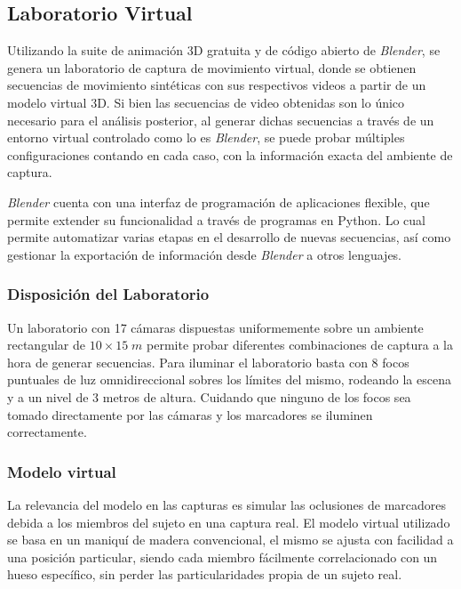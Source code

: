 \subsection{Laboratorio Virtual}

Utilizando la suite de animación 3D gratuita y de código abierto de \textit{Blender}, se genera un laboratorio de captura de movimiento virtual, donde se obtienen secuencias de movimiento sintéticas con sus respectivos videos a partir de un modelo virtual 3D.  Si bien las secuencias de video obtenidas son lo único necesario para el análisis posterior, al generar dichas secuencias a través de un entorno virtual controlado como lo es \textit{Blender}, se puede probar múltiples configuraciones contando en cada caso, con la información exacta del ambiente de captura.

\textit{Blender} cuenta con una interfaz de programación de aplicaciones flexible, que permite extender su funcionalidad a través de programas en Python. Lo cual permite automatizar varias etapas en el desarrollo de nuevas secuencias, así como gestionar la exportación de información desde \textit{Blender} a otros lenguajes.

\subsubsection{Disposición del Laboratorio}

Un laboratorio con 17 cámaras dispuestas uniformemente sobre un ambiente rectangular de $10\times15\;m $ permite probar diferentes combinaciones de captura a la hora de generar secuencias. 
Para iluminar el laboratorio basta con $8$ focos puntuales de luz omnidireccional sobres los límites del mismo, rodeando la escena y a un nivel de 3 metros de altura. Cuidando que ninguno de los focos sea tomado directamente por las cámaras y los marcadores se iluminen correctamente.


\subsubsection{Modelo virtual}  
La relevancia del modelo en las capturas es simular las oclusiones de marcadores debida a los miembros del sujeto en una captura real.
El modelo virtual utilizado se basa en un maniquí de madera convencional, el mismo se ajusta con facilidad a una posición particular, siendo cada miembro fácilmente correlacionado con un hueso específico, sin perder las particularidades propia de un sujeto real.

